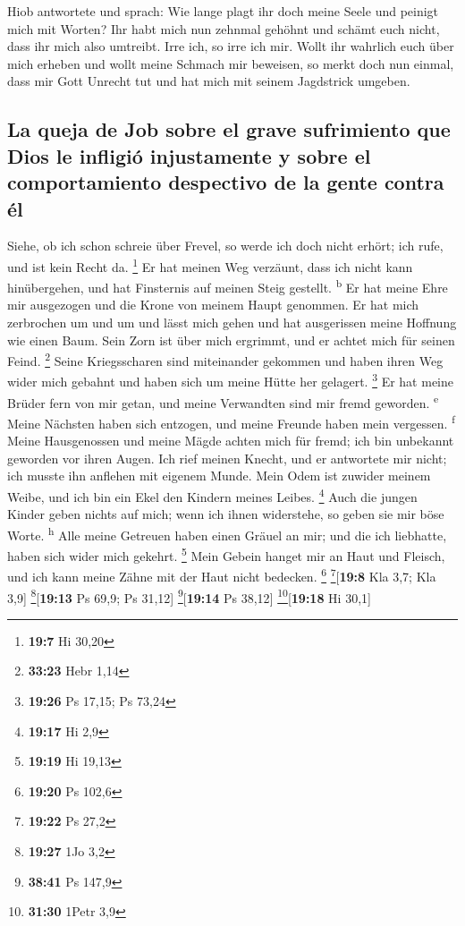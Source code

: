  Hiob antwortete und sprach:  Wie lange
plagt ihr doch meine Seele und peinigt mich mit Worten? 
Ihr habt mich nun zehnmal gehöhnt und schämt euch nicht, dass ihr mich
also umtreibt.  Irre ich, so irre ich mir. 
Wollt ihr wahrlich euch über mich erheben und wollt meine Schmach mir
beweisen,  so merkt doch nun einmal, dass mir Gott Unrecht
tut und hat mich mit seinem Jagdstrick umgeben.

\hypertarget{la-queja-de-job-sobre-el-grave-sufrimiento-que-dios-le-infligiuxf3-injustamente-y-sobre-el-comportamiento-despectivo-de-la-gente-contra-uxe9l}{%
\subsection{La queja de Job sobre el grave sufrimiento que Dios le
infligió injustamente y sobre el comportamiento despectivo de la gente
contra
él}\label{la-queja-de-job-sobre-el-grave-sufrimiento-que-dios-le-infligiuxf3-injustamente-y-sobre-el-comportamiento-despectivo-de-la-gente-contra-uxe9l}}

 Siehe, ob ich schon schreie über Frevel, so werde ich
doch nicht erhört; ich rufe, und ist kein Recht da. \footnote{\textbf{19:7}
  Hi 30,20}  Er hat meinen Weg verzäunt, dass ich nicht
kann hinübergehen, und hat Finsternis auf meinen Steig gestellt.
\textsuperscript{b}  Er hat meine Ehre mir ausgezogen und
die Krone von meinem Haupt genommen.  Er hat mich
zerbrochen um und um und lässt mich gehen und hat ausgerissen meine
Hoffnung wie einen Baum.  Sein Zorn ist über mich
ergrimmt, und er achtet mich für seinen Feind. \footnote{\textbf{33:23}
  Hebr 1,14}  Seine Kriegsscharen sind miteinander
gekommen und haben ihren Weg wider mich gebahnt und haben sich um meine
Hütte her gelagert. \footnote{\textbf{19:26} Ps 17,15; Ps 73,24}
 Er hat meine Brüder fern von mir getan, und meine
Verwandten sind mir fremd geworden. \textsuperscript{e} 
Meine Nächsten haben sich entzogen, und meine Freunde haben mein
vergessen. \textsuperscript{f}  Meine Hausgenossen und
meine Mägde achten mich für fremd; ich bin unbekannt geworden vor ihren
Augen.  Ich rief meinen Knecht, und er antwortete mir
nicht; ich musste ihn anflehen mit eigenem Munde.  Mein
Odem ist zuwider meinem Weibe, und ich bin ein Ekel den Kindern meines
Leibes. \footnote{\textbf{19:17} Hi 2,9}  Auch die jungen
Kinder geben nichts auf mich; wenn ich ihnen widerstehe, so geben sie
mir böse Worte. \textsuperscript{h}  Alle meine Getreuen
haben einen Gräuel an mir; und die ich liebhatte, haben sich wider mich
gekehrt. \footnote{\textbf{19:19} Hi 19,13}  Mein Gebein
hanget mir an Haut und Fleisch, und ich kann meine Zähne mit der Haut
nicht bedecken. \footnote{\textbf{19:20} Ps 102,6}
\footnote{\textbf{19:22} Ps 27,2}{[}\textbf{19:8} Kla 3,7; Kla 3,9{]}
\footnote{\textbf{19:27} 1Jo 3,2}{[}\textbf{19:13} Ps 69,9; Ps 31,12{]}
\footnote{\textbf{38:41} Ps 147,9}{[}\textbf{19:14} Ps 38,12{]}
\footnote{\textbf{31:30} 1Petr 3,9}{[}\textbf{19:18} Hi 30,1{]}

